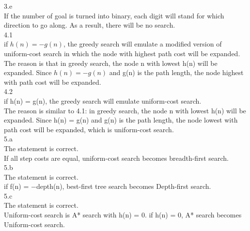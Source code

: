 \documentclass[a4paper]{article}
\begin{document}
3.e\\
If the number of goal is turned into binary, each digit will stand for which direction to go along. As a result, there will be no search.\\

4.1\\
if $h(n) = -g(n)$, the greedy search will emulate a modified version of uniform-cost search in which the node with highest path cost will be expanded.\\
The reason is that in greedy search, the node n with lowest h(n) will be expanded. Since $h(n) = −g(n)$ and g(n) is the path length, the node highest with path cost will be expanded.\\

4.2\\
if h(n) = g(n), the greedy search will emulate uniform-cost search.\\
The reason is similar to 4.1: in greedy search, the node n with lowest h(n) will be expanded. Since h(n) = g(n) and g(n) is the path length, the node lowest with path cost will be expanded, which is uniform-cost search.\\

5.a \\
The statement is correct. \\
If all step costs are equal, uniform-cost search becomes breadth-first search.\\

5.b\\
The statement is correct. \\
if f(n) = −depth(n),  best-first tree search becomes Depth-first search.\\

5.c\\
The statement is correct. \\
Uniform-cost search is A* search with h(n) = 0.
if h(n) = 0, A* search becomes Uniform-cost search.\\
\end{document}
